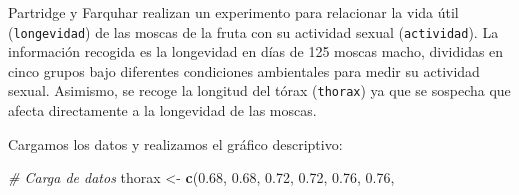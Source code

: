 \documentclass[
]{book}
\newenvironment{Shaded}{\begin{snugshade}}{\end{snugshade}}
\newcommand{\CommentTok}[1]{\textcolor[rgb]{0.56,0.35,0.01}{\textit{#1}}}
\newcommand{\FloatTok}[1]{\textcolor[rgb]{0.00,0.00,0.81}{#1}}
\newcommand{\KeywordTok}[1]{\textcolor[rgb]{0.13,0.29,0.53}{\textbf{#1}}}
\newcommand{\NormalTok}[1]{#1}
\newcommand{\StringTok}[1]{\textcolor[rgb]{0.31,0.60,0.02}{#1}}
\theoremstyle{definition}
\theoremstyle{definition}
\theoremstyle{definition}
\theoremstyle{remark}
\let\BeginKnitrBlock\begin \let\EndKnitrBlock\end
\begin{document}
\BeginKnitrBlock{example}[Longevidad]
\protect\hypertarget{exm:acov02}{}{\label{exm:acov02} \iffalse (Longevidad) \fi{} }Partridge y Farquhar realizan un experimento para relacionar la vida útil (\texttt{longevidad}) de las moscas de la fruta con su actividad sexual (\texttt{actividad}). La información recogida es la longevidad en días de 125 moscas macho, divididas en cinco grupos bajo diferentes condiciones ambientales para medir su actividad sexual. Asimismo, se recoge la longitud del tórax (\texttt{thorax}) ya que se sospecha que afecta directamente a la longevidad de las moscas.
\EndKnitrBlock{example}

Cargamos los datos y realizamos el gráfico descriptivo:

\begin{Shaded}
\begin{Highlighting}[]
\CommentTok{# Carga de datos}
\NormalTok{thorax <-}\StringTok{ }\KeywordTok{c}\NormalTok{(}\FloatTok{0.68}\NormalTok{, }\FloatTok{0.68}\NormalTok{, }\FloatTok{0.72}\NormalTok{, }\FloatTok{0.72}\NormalTok{, }\FloatTok{0.76}\NormalTok{, }\FloatTok{0.76}\NormalTok{, }

\end{Highlighting}
\end{Shaded}
\end{document}
